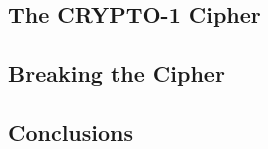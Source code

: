 \documentclass[pdflatex, a4paper,12pt]{article}
\begin{document}
\subsection{The CRYPTO-1 Cipher}

\subsection{Breaking the Cipher}

\subsection{Conclusions}


{}
\end{document}
